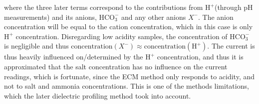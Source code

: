 \documentclass[../../CompleteThesis/Complete_1stDraft.tex]{subfiles}
\begin{document}
where the three later terms correspond to the contributions from $\text{H}^+$(through pH measurements) and its anions\footnotemark, $\text{HCO}_3^-$ and any other anions $X^-$. The anion concentration will be equal to the cation concentration, which in this case is only $\text{H}^+$ concentration. Disregarding low acidity samples, the concentration of $\text{HCO}_3^-$ is negligible and thus  $\text{concentration}(X^-) \approx \text{concentration}(\text{H}^+)$. 
The current is thus heavily influenced on/determined by the $\text{H}^+$ concentration, and thus it is approximated that the salt concentration has no influence on the current readings, which is fortunate, since the ECM method only responds to acidity, and not to salt and ammonia concentrations. This is one of the methods limitations, which the later dielectric profiling method took into account.

\end{document}
